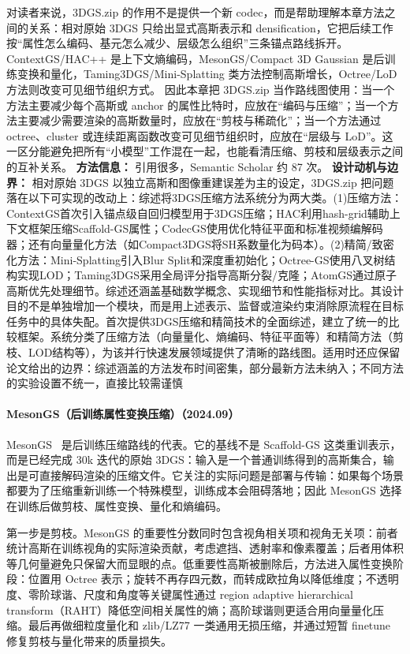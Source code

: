 对读者来说，3DGS.zip 的作用不是提供一个新 codec，而是帮助理解本章方法之间的关系：相对原始 3DGS 只给出显式高斯表示和 densification，它把后续工作按“属性怎么编码、基元怎么减少、层级怎么组织”三条锚点路线拆开。ContextGS/HAC++ 是上下文熵编码，MesonGS/Compact 3D Gaussian 是后训练变换和量化，Taming3DGS/Mini-Splatting 类方法控制高斯增长，Octree/LoD 方法则改变可见细节组织方式。
因此本章把 3DGS.zip 当作路线图使用：当一个方法主要减少每个高斯或 anchor 的属性比特时，应放在“编码与压缩”；当一个方法主要减少需要渲染的高斯数量时，应放在“剪枝与稀疏化”；当一个方法通过 octree、cluster 或连续距离函数改变可见细节组织时，应放在“层级与 LoD”。这一区分能避免把所有“小模型”工作混在一起，也能看清压缩、剪枝和层级表示之间的互补关系。
\textbf{方法信息：} 引用很多，Semantic Scholar 约 87 次。
\textbf{设计动机与边界：} 相对原始 3DGS 以独立高斯和图像重建误差为主的设定，3DGS.zip 把问题落在以下可实现的改动上：综述将3DGS压缩方法系统分为两大类。(1)压缩方法：ContextGS首次引入锚点级自回归模型用于3DGS压缩；HAC利用hash-grid辅助上下文框架压缩Scaffold-GS属性；CodecGS使用优化特征平面和标准视频编解码器；还有向量量化方法（如Compact3DGS将SH系数量化为码本）。(2)精简/致密化方法：Mini-Splatting引入Blur Split和深度重初始化；Octree-GS使用八叉树结构实现LOD；Taming3DGS采用全局评分指导高斯分裂/克隆；AtomGS通过原子高斯优先处理细节。综述还涵盖基础数学概念、实现细节和性能指标对比。其设计目的不是单独增加一个模块，而是用上述表示、监督或渲染约束消除原流程在目标任务中的具体失配。首次提供3DGS压缩和精简技术的全面综述，建立了统一的比较框架。系统分类了压缩方法（向量量化、熵编码、特征平面等）和精简方法（剪枝、LOD结构等），为该并行快速发展领域提供了清晰的路线图。适用时还应保留论文给出的边界：综述涵盖的方法发布时间密集，部分最新方法未纳入；不同方法的实验设置不统一，直接比较需谨慎
\paragraph{MesonGS（后训练属性变换压缩）（2024.09）}
MesonGS~\cite{2409_09756} 是后训练压缩路线的代表。它的基线不是 Scaffold-GS 这类重训表示，而是已经完成 30k 迭代的原始 3DGS：输入是一个普通训练得到的高斯集合，输出是可直接解码渲染的压缩文件。它关注的实际问题是部署与传输：如果每个场景都要为了压缩重新训练一个特殊模型，训练成本会阻碍落地；因此 MesonGS 选择在训练后做剪枝、属性变换、量化和熵编码。

第一步是剪枝。MesonGS 的重要性分数同时包含视角相关项和视角无关项：前者统计高斯在训练视角的实际渲染贡献，考虑遮挡、透射率和像素覆盖；后者用体积等几何量避免只保留大而显眼的点。低重要性高斯被删除后，方法进入属性变换阶段：位置用 Octree 表示；旋转不再存四元数，而转成欧拉角以降低维度；不透明度、零阶球谐、尺度和角度等关键属性通过 region adaptive hierarchical transform（RAHT）降低空间相关属性的熵；高阶球谐则更适合用向量量化压缩。最后再做细粒度量化和 zlib/LZ77 一类通用无损压缩，并通过短暂 finetune 修复剪枝与量化带来的质量损失。

